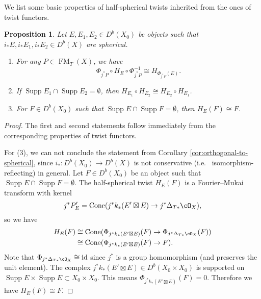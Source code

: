 \documentclass{amsart}
\numberwithin{equation}{section}
\theoremstyle{plain}
\newtheorem{proposition}[theorem]{Proposition}
\theoremstyle{definition}
\DeclareMathOperator{\Cone}{\mathrm{Cone}}
\DeclareMathOperator{\id}{\mathrm{id}}
\DeclareMathOperator{\Supp}{\mathrm{Supp}}
\DeclareMathOperator{\FM}{\mathrm{FM}}
\begin{document}
We list some basic properties of half-spherical twists inherited from the ones of twist functors.
\begin{proposition}\label{prop:empty-intersection}
    Let $E, E_1, E_2 \in D^b(X_0)$ be objects such that $i_*E, i_*E_1, i_*E_2 \in D^b(X)$ are spherical.
    \begin{enumerate}
        \item For any $P \in \FM_T(X)$, we have\begin{equation}
                  \Phi_{j^*P} \circ H_E \circ \Phi_{j^*P}^{-1} \cong H_{\Phi_{j^*P}(E)}.
              \end{equation}
        \item If $\Supp E_1 \cap \Supp E_2 = \emptyset$, then $H_{E_1} \circ H_{E_2} \cong H_{E_2} \circ H_{E_1}$.
        \item For $F \in D^b(X_0)$ such that $\Supp E \cap \Supp F = \emptyset$, then $H_E (F) \cong F$.
    \end{enumerate}
\end{proposition}
\begin{proof}
    The first and second statements follow immediately from the corresponding properties of twist functors.

    For (3), we can not conclude the statement from Corollary \ref{cor:orthogonal-to-spherical}, since $i_* \colon D^b(X_0) \to D^b(X)$ is not conservative (i.e.~ isomorphism-reflecting) in general.
    Let $F \in D^b(X_0)$ be an object such that $\Supp E \cap \Supp F = \emptyset$.
    The half-spherical twist $H_E(F)$ is a Fourier--Mukai transform with kernel
    \begin{equation}
        j^*P'_E = \Cone(j^*k_*(E' \boxtimes E) \to j^*\Delta_{T*}\cO_X),
    \end{equation}
    so we have
    \begin{align}
        H_E(F) & \cong \Cone(\Phi_{j^*k_*(E' \boxtimes E)}(F) \to \Phi_{j^*\Delta_{T*}\cO_X}(F)) \\
               & \cong \Cone(\Phi_{j^*k_*(E' \boxtimes E)}(F) \to F).
    \end{align}
    Note that $\Phi_{j^*\Delta_{T*}\cO_X} \cong \id$ since $j^*$ is a group homomorphism (and preserves the unit element).
    The complex $j^*k_*(E' \boxtimes E) \in D^b(X_0 \times X_0)$ is supported on $\Supp E \times \Supp E \subset X_0 \times X_0$.
    This means $\Phi_{j^*k_*(E' \boxtimes E)}(F) = 0$.
    Therefore we have $H_E(F) \cong F$.
\end{proof}
\end{document}
